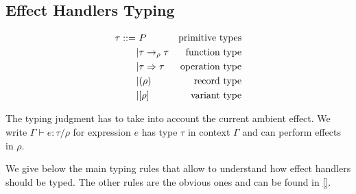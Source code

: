 \documentclass[nonacm=true, language=french, language=english]{acmart}
\begin{document}
\subsection{Effect Handlers Typing}
\label{sec:effect-handl-typing}

\begin{align*}
  \tau ::=\ & P & \text{primitive types} \\
  \mid & \tau \to_{\rho} \tau & \text{function type} \\
  \mid & \tau \To \tau & \text{operation type} \\
  \mid & (\rho) & \text{record type} \\
  \mid & [\rho] & \text{variant type}
\end{align*}



The typing judgment has to take into account the current ambient effect. We write $\Gamma \vdash e : \tau / \rho$ for expression $e$ has type $\tau$ in context $\Gamma$ and can perform effects in $\rho$.

We give below the main typing rules that allow to understand how effect handlers should be typed. The other rules are the obvious ones and can be found in \ref{}.

\begin{prooftree}
\end{prooftree}

\begin{prooftree}
\end{prooftree}

\begin{prooftree}
\end{prooftree}

\begin{prooftree}
\end{prooftree}
\end{document}
